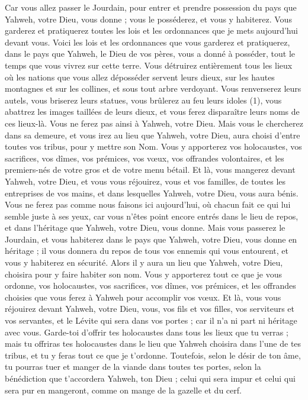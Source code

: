 \begin{multicols}{2}
Car vous allez passer le Jourdain, pour entrer et prendre possession du pays que Yahweh, votre Dieu, vous donne ; vous le posséderez, et vous y habiterez.
Vous garderez et pratiquerez toutes les lois et les ordonnances que je mets aujourd'hui devant vous.
\VerseOne{}Voici les lois et les ordonnances que vous garderez et pratiquerez, dans le pays que Yahweh, le Dieu de vos pères, vous a donné à posséder, tout le temps que vous vivrez sur cette terre.
Vous détruirez entièrement tous les lieux où les nations que vous allez déposséder servent leurs dieux, sur les hautes montagnes et sur les collines, et sous tout arbre verdoyant.
Vous renverserez leurs autels, vous briserez leurs statues, vous brûlerez au feu leurs idoles (1), vous abattrez les images taillées de leurs dieux, et vous ferez disparaître leurs noms de ces lieux-là.
Vous ne ferez pas ainsi à Yahweh, votre Dieu.
Mais vous le chercherez dans sa demeure, et vous irez au lieu que Yahweh, votre Dieu, aura choisi d'entre toutes vos tribus, pour y mettre son Nom.
Vous y apporterez vos holocaustes, vos sacrifices, vos dîmes, vos prémices, vos vœux, vos offrandes volontaires, et les premiers-nés de votre gros et de votre menu bétail.
Et là, vous mangerez devant Yahweh, votre Dieu, et vous vous réjouirez, vous et vos familles, de toutes les entreprises de vos mains, et dans lesquelles Yahweh, votre Dieu, vous aura bénis.
Vous ne ferez pas comme nous faisons ici aujourd'hui, où chacun fait ce qui lui semble juste à ses yeux,
car vous n'êtes point encore entrés dans le lieu de repos, et dans l'héritage que Yahweh, votre Dieu, vous donne.
Mais vous passerez le Jourdain, et vous habiterez dans le pays que Yahweh, votre Dieu, vous donne en héritage ; il vous donnera du repos de tous vos ennemis qui vous entourent, et vous y habiterez en sécurité.
Alors il y aura un lieu que Yahweh, votre Dieu, choisira pour y faire habiter son nom. Vous y apporterez tout ce que je vous ordonne, vos holocaustes, vos sacrifices, vos dîmes, vos prémices, et les offrandes choisies que vous ferez à Yahweh pour accomplir vos vœux.
Et là, vous vous réjouirez devant Yahweh, votre Dieu, vous, vos fils et vos filles, vos serviteurs et vos servantes, et le Lévite qui sera dans vos portes ; car il n'a ni part ni héritage avec vous.
Garde-toi d’offrir tes holocaustes dans tous les lieux que tu verras ;
mais tu offriras tes holocaustes dans le lieu que Yahweh choisira dans l'une de tes tribus, et tu y feras tout ce que je t’ordonne.
Toutefois, selon le désir de ton âme, tu pourras tuer et manger de la viande dans toutes tes portes, selon la bénédiction que t’accordera Yahweh, ton Dieu ; celui qui sera impur et celui qui sera pur en mangeront, comme on mange de la gazelle et du cerf.

\end{multicols}
